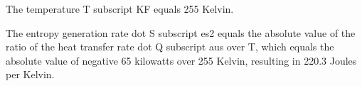 The temperature T subscript KF equals 255 Kelvin.

The entropy generation rate dot S subscript es2 equals the absolute value of the ratio of the heat transfer rate dot Q subscript aus over T, which equals the absolute value of negative 65 kilowatts over 255 Kelvin, resulting in 220.3 Joules per Kelvin.